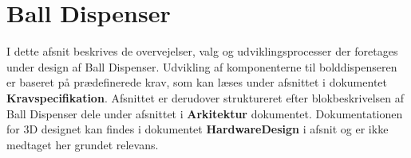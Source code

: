 \documentclass[Rapport/Rapport_main.tex]{subfiles}
\begin{document}
\section{Ball Dispenser}
I dette afsnit beskrives de overvejelser, valg og udviklingsprocesser der foretages under design af Ball Dispenser. Udvikling af komponenterne til bolddispenseren er baseret på prædefinerede krav, som kan læses under afsnittet  i dokumentet \textbf{Kravspecifikation}. Afsnittet er derudover struktureret efter blokbeskrivelsen af Ball Dispenser dele under afsnittet  i \textbf{Arkitektur} dokumentet. Dokumentationen for 3D designet kan findes i dokumentet \textbf{HardwareDesign} i afsnit  og er ikke medtaget her grundet relevans.




\end{document}
